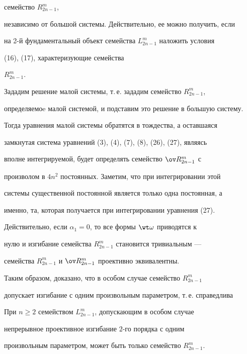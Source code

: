 семейство $R^m_{2n-1}$, 


независимо от большой системы. Действительно, ее можно получить, если 


на 2-й фундаментальный объект семейства $L^m_{2n-1}$ наложить условия 


(16), (17), характеризующие семейства 


$R^m_{2n-1}$. 


 


Зададим решение малой системы, т.\,е. зададим семейство $R^m_{2n-1}$, 


определяемоe малой системой, и подставим это решение в большую систему. 


Тогда уравнения малой системы обратятся в тождества, а оставшаяся 


замкнутая система уравнений (3), (4), (7), (8), (26), (27), являясь 


вполне интегрируемой, будет определять семейство $\ov R^m_{2n-1}$ с 


произволом в $4n^2$ постоянных. Заметим, что при интегрировании этой 


системы существенной постоянной является только одна постоянная, а 


именно, та, которая получается при интегрировании уравнения (27). 


 


Действительно, если $\alpha_1=0$, то все формы $\wt\omega$ приводятся к 


нулю и изгибание семейства $R^m_{2n-1}$ становится тривиальным --- 


семейства $R^m_{2n-1}$ и $\ov R^m_{2n-1}$ проективно эквивалентны. 


Таким образом, доказано, что в особом случае семейство $R^m_{2n-1}$ 


допускает изгибание с одним произвольным параметром, т.\,е. справедлива 


 


\begin{thm} 


При $n\ge2$ семейством $L^m_{2n-1}$, допускающим в особом случае 


непрерывное проективное изгибание $2$-го порядка с одним


произвольным параметром, может быть только семейство $R^m_{2n-1}$. 


\end{thm} 


